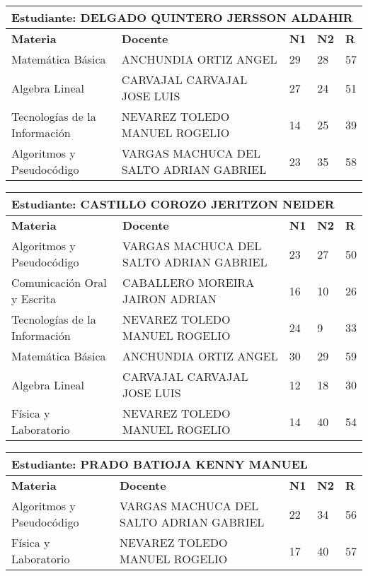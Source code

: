 \small
\begin{tabularx}{\textwidth}{|p{5cm}|p{7cm}|X|X|X|}
\hline
\multicolumn{5}{|p{\dimexpr\textwidth-2\tabcolsep-2\arrayrulewidth}|}{\textbf{Estudiante: DELGADO  QUINTERO JERSSON ALDAHIR }}\\\hline
\textbf{Materia} & \textbf{Docente} & \textbf{N1} & \textbf{N2} & \textbf{R} \\ \hline
Matemática Básica & ANCHUNDIA ORTIZ ANGEL   & 29 & 28& 57 \\ \hline
Algebra Lineal & CARVAJAL CARVAJAL JOSE LUIS  & 27 & 24& 51 \\ \hline
Tecnologías de la Información  & NEVAREZ TOLEDO MANUEL ROGELIO  & 14 & 25& 39 \\ \hline
Algoritmos y Pseudocódigo & VARGAS MACHUCA DEL SALTO ADRIAN GABRIEL  & 23 & 35& 58 \\ \hline
\end{tabularx}\vspace{10mm}
\small
\begin{tabularx}{\textwidth}{|p{5cm}|p{7cm}|X|X|X|}
\hline
\multicolumn{5}{|p{\dimexpr\textwidth-2\tabcolsep-2\arrayrulewidth}|}{\textbf{Estudiante: CASTILLO COROZO JERITZON NEIDER }}\\\hline
\textbf{Materia} & \textbf{Docente} & \textbf{N1} & \textbf{N2} & \textbf{R} \\ \hline
Algoritmos y Pseudocódigo & VARGAS MACHUCA DEL SALTO ADRIAN GABRIEL  & 23 & 27& 50 \\ \hline
Comunicación Oral y Escrita & CABALLERO MOREIRA JAIRON ADRIAN  & 16 & 10& 26 \\ \hline
Tecnologías de la Información  & NEVAREZ TOLEDO MANUEL ROGELIO  & 24 & 9& 33 \\ \hline
Matemática Básica & ANCHUNDIA ORTIZ ANGEL   & 30 & 29& 59 \\ \hline
Algebra Lineal & CARVAJAL CARVAJAL JOSE LUIS  & 12 & 18& 30 \\ \hline
Física y Laboratorio & NEVAREZ TOLEDO MANUEL ROGELIO  & 14 & 40& 54 \\ \hline
\end{tabularx}\vspace{10mm}
\small
\begin{tabularx}{\textwidth}{|p{5cm}|p{7cm}|X|X|X|}
\hline
\multicolumn{5}{|p{\dimexpr\textwidth-2\tabcolsep-2\arrayrulewidth}|}{\textbf{Estudiante: PRADO BATIOJA KENNY MANUEL }}\\\hline
\textbf{Materia} & \textbf{Docente} & \textbf{N1} & \textbf{N2} & \textbf{R} \\ \hline
Algoritmos y Pseudocódigo & VARGAS MACHUCA DEL SALTO ADRIAN GABRIEL  & 22 & 34& 56 \\ \hline
Física y Laboratorio & NEVAREZ TOLEDO MANUEL ROGELIO  & 17 & 40& 57 \\ \hline
\end{tabularx}\vspace{10mm}

